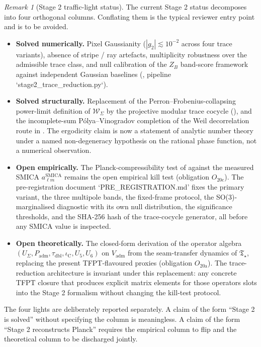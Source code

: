 \documentclass[11pt,a4paper]{article}
\theoremstyle{definition}
\theoremstyle{remark}
\newtheorem*{remark}{Remark}
\newcommand{\taudbl}{\tau_{\mathrm{dbl}}}
\newcommand{\iC}{\iota_{\mathrm C}}
\newcommand{\Padm}{P_{\mathrm{adm}}}
\newcommand{\Tstar}{\mathfrak T_{\star}}
\begin{document}
\begin{remark}[Stage 2 traffic-light status]
\label{rem:stage2-traffic-light}
The current Stage 2 status decomposes into four orthogonal columns. Conflating them is the
typical reviewer entry point and is to be avoided.
\begin{itemize}[leftmargin=2.0em,topsep=3pt,itemsep=2pt]
\item \textbf{Solved numerically.} Pixel Gaussianity ($|g_2|\lesssim 10^{-2}$ across four
trace variants), absence of stripe / ray artefacts, multiplicity robustness over the
admissible trace class, and null calibration of the $Z_B$ band-score framework against
independent Gaussian baselines (, pipeline
`stage2\_trace\_reduction.py`).
\item \textbf{Solved structurally.} Replacement of the Perron--Frobenius-collapsing power-limit
definition of $\mathcal W_\Sigma$ by the projective modular trace cocycle
(), and the incomplete-sum P\'olya--Vinogradov
completion of the Weil decorrelation route in . The
ergodicity claim is now a statement of analytic number theory under a named
non-degeneracy hypothesis on the rational phase function, not a numerical observation.
\item \textbf{Open empirically.} The Planck-compressibility test of
 against the measured SMICA $a_{\ell m}^{\mathrm{SMICA}}$
remains the open empirical kill test (obligation $O_{20\mathrm{c}}$). The pre-registration
document `PRE\_REGISTRATION.md' fixes the primary variant, the three multipole bands, the
fixed-frame protocol, the SO(3)-marginalised diagnostic with its own null distribution, the
significance thresholds, and the SHA-256 hash of the trace-cocycle generator, all before any
SMICA value is inspected.
\item \textbf{Open theoretically.} The closed-form derivation of the operator algebra
$(U_\Sigma,\Padm,\taudbl,\iC,U_5,U_6)$ on $V_{\mathrm{adm}}$ from the seam-transfer dynamics
of $\Tstar$, replacing the present TFPT-flavoured proxies (obligation $O_{20\mathrm{a}}$).
The trace-reduction architecture is invariant under this replacement: any concrete TFPT
closure that produces explicit matrix elements for those operators slots into the Stage 2
formalism without changing the kill-test protocol.
\end{itemize}
The four lights are deliberately reported separately. A claim of the form ``Stage 2 is
solved'' without specifying the column is meaningless. A claim of the form
``Stage 2 reconstructs Planck'' requires the empirical column to flip and the theoretical
column to be discharged jointly.
\end{remark}
\end{document}
